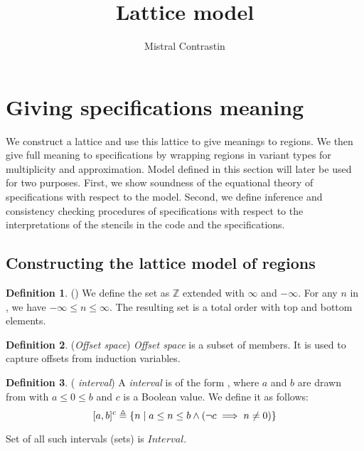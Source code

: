 \documentclass[acmlarge,review]{acmart}
\theoremstyle{definition}
\newtheorem{defn}{Definition}
\theoremstyle{plain}
\theoremstyle{remark}
\begin{document}
\title{Lattice model}
\author{Mistral Contrastin}

\section{Giving specifications meaning}

We construct a lattice and use this lattice to give meanings to regions. We
then give full meaning to specifications by wrapping regions in variant types
for multiplicity and approximation. Model defined in this section will later be
used for two purposes. First, we show soundness of the equational theory of
specifications with respect to the model. Second, we define inference and
consistency checking procedures of specifications with respect to the
interpretations of the stencils in the code and the specifications.

\subsection{Constructing the lattice model of regions}

\begin{defn}{(\zinf)}
  We define the set \zinf{} as $\mathbb{Z}$ extended with $\infty$ and
  $-\infty$. For any $n$ in \zinf{}, we have $-\infty \leq n \leq \infty$. The
  resulting set is a total order with top and bottom elements.
\end{defn}

\begin{defn}{(\emph{Offset space})}
  \emph{Offset space} is a subset of \zinf{} members. It is used to capture
  offsets from induction variables.
\end{defn}

\begin{defn}{(\emph{\zinf{} interval})}
  A \emph{\zinf{} interval} is of the form , where $a$ and $b$
  are drawn from \zinf{} with $a \leq 0 \leq b$ and $c$ is a Boolean value. We
  define it as follows:
%
  \begin{equation*}
    \textnormal{$\lbrack a,b\rbrack^{c}$} \triangleq
      \{ n \;|\; a \leq n \leq b \wedge (\neg c \implies n \neq 0) \}
  \end{equation*}

  Set of all such intervals (sets) is $\textit{Interval}$.
\end{defn}
\end{document}
